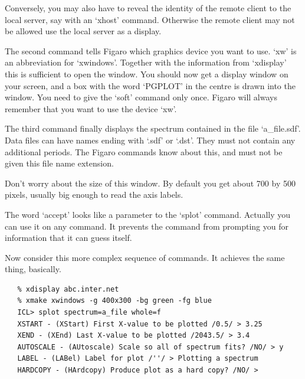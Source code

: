    Conversely, you may also have to reveal the identity of the remote
   client to the local server, say with an `xhost' command. Otherwise
   the remote client may not be allowed use the local server as a
   display.

   The second command tells Figaro which graphics device you want to
   use. `xw' is an abbreviation for `xwindows'. Together with the
   information from `xdisplay' this is sufficient to open the window.
   You should now get a display window on your screen, and a box with
   the word `PGPLOT' in the centre is drawn into the window. You need
   to give the `soft' command only once. Figaro will always remember
   that you want to use the device `xw'.

   The third command finally displays the spectrum contained in the file
   `a\_file.sdf'. Data files can have names ending with `.sdf' or
   `.dst'. They must not contain any additional periods. The Figaro
   commands know about this, and must not be given this file name
   extension.

   Don't worry about the size of this window. By default you get about
   700 by 500 pixels, usually big enough to read the axis labels.

   The word `accept' looks like a parameter to the `splot' command.
   Actually you can use it on any command. It prevents the command from
   prompting you for information that it can guess itself.

   Now consider this more complex sequence of commands. It achieves the
   same thing, basically.

\begin{verbatim}
   % xdisplay abc.inter.net
   % xmake xwindows -g 400x300 -bg green -fg blue
   ICL> splot spectrum=a_file whole=f
   XSTART - (XStart) First X-value to be plotted /0.5/ > 3.25
   XEND - (XEnd) Last X-value to be plotted /2043.5/ > 3.4
   AUTOSCALE - (AUtoscale) Scale so all of spectrum fits? /NO/ > y
   LABEL - (LABel) Label for plot /''/ > Plotting a spectrum
   HARDCOPY - (HArdcopy) Produce plot as a hard copy? /NO/ >
\end{verbatim}


